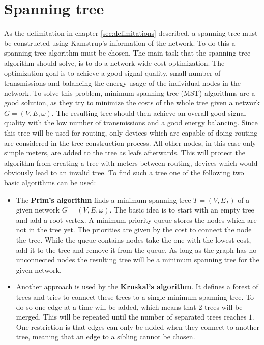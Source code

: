 \section{Spanning tree}
\label{sec:spanning_tree}

As the delimitation in chapter \ref{sec:delimitations} described, a spanning tree must be constructed using Kamstrup's information of the network. To do this a spanning tree algorithm must be chosen. The main task that the spanning tree algorithm should solve, is to do a network wide cost optimization. The optimization goal is to achieve a good signal quality, small number of transmissions and balancing the energy usage of the individual nodes in the network. To solve this problem, minimum spanning tree (MST) algorithms are a good solution, as they try to minimize the costs of the whole tree given a network $G=(V,E,\omega)$. The resulting tree should then achieve an overall good signal quality with the low number of transmissions and a good energy balancing. Since this tree will be used for routing, only devices which are capable of doing routing are considered in the tree construction process. All other nodes, in this case only simple meters, are added to the tree as leafs afterwards. This will protect the algorithm from creating a tree with meters between routing, devices which would obviously lead to an invalid tree. To find such a tree one of the following two basic algorithms can be used:
\begin{itemize}
\item The \textbf{Prim's algorithm} finds a minimum spanning tree $T=(V,E_T)$ of a given network $G=(V,E,\omega)$. The basic idea is to start with an empty tree and add a root vertex. A minimum priority queue stores the nodes which are not in the tree yet. The priorities are given by the cost to connect the node the tree. While the queue contains nodes take the one with the lowest cost, add it to the tree and remove it from the queue. As long as the graph has no unconnected nodes the resulting tree will be a minimum spanning tree for the given network.
\item Another approach is used by the \textbf{Kruskal's algorithm}. It defines a forest of trees and tries to connect these trees to a single minimum spanning tree. To do so one edge at a time will be added, which means that 2 trees will be merged. This will be repeated until the number of separated trees reaches $1$. One restriction is that edges can only be added when they connect to another tree, meaning that an edge to a sibling cannot be chosen.
\end{itemize}
